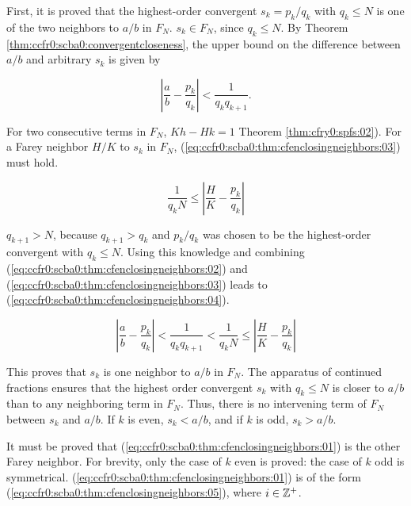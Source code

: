 \begin{vworktheoremproof}
First, it is proved that the highest-order
convergent $s_k = p_k/q_k$ with $q_k \leq N$ is one of the two
neighbors to $a/b$ in $F_N$.  $s_k \in F_N$, since $q_k \leq N$.
By Theorem \ref{thm:ccfr0:scba0:convergentcloseness}, the upper bound on the
difference between $a/b$ and arbitrary $s_k$ is given by

\begin{equation}
\label{eq:ccfr0:scba0:thm:cfenclosingneighbors:02}
\left| {\frac{a}{b}  - \frac{{p_k }}{{q_k }}} \right| < \frac{1}{{q_k q_{k + 1} }}.
\end{equation}

For two consecutive terms in $F_N$, $Kh-Hk=1$ 
Theorem \ref{thm:cfry0:spfs:02}).
For a Farey neighbor $H/K$ to $s_k$ in $F_N$, 
(\ref{eq:ccfr0:scba0:thm:cfenclosingneighbors:03}) must hold.

\begin{equation}
\label{eq:ccfr0:scba0:thm:cfenclosingneighbors:03}
\frac{1}{q_k N} \leq \left| {\frac{H}{K} - \frac{p_k}{q_k}} \right|
\end{equation}

$q_{k+1}>N$, because $q_{k+1}>q_k$ and $p_k/q_k$ was chosen to be the
highest-order convergent with $q_k\leq N$.  Using this knowledge and
combining (\ref{eq:ccfr0:scba0:thm:cfenclosingneighbors:02}) and 
(\ref{eq:ccfr0:scba0:thm:cfenclosingneighbors:03}) leads to
(\ref{eq:ccfr0:scba0:thm:cfenclosingneighbors:04}).

\begin{equation}
\label{eq:ccfr0:scba0:thm:cfenclosingneighbors:04}
\left| {\frac{a}{b}  - \frac{{p_k }}{{q_k }}} \right| < \frac{1}{{q_k q_{k + 1} }}
<
\frac{1}{q_k N} \leq \left| {\frac{H}{K} - \frac{p_k}{q_k}} \right|
\end{equation}

This proves that $s_k$ is one neighbor to $a/b$ in $F_N$.
The apparatus of continued fractions ensures that the
highest order convergent $s_k$ with $q_k\leq N$ is closer to $a/b$ than
to any neighboring term in $F_N$.  Thus, there is
no intervening term of $F_N$ between $s_k$ and $a/b$.
If $k$ is even, $s_k<a/b$, and if $k$ is
odd, $s_k>a/b$.

It must be proved that (\ref{eq:ccfr0:scba0:thm:cfenclosingneighbors:01}) is the other Farey
neighbor.  For brevity, only the case of $k$ even is proved:  the
case of $k$ odd is symmetrical.  (\ref{eq:ccfr0:scba0:thm:cfenclosingneighbors:01}) 
is of the form (\ref{eq:ccfr0:scba0:thm:cfenclosingneighbors:05}),
where $i \in {\mathbb{Z}^+}$.


\end{vworktheoremproof}
